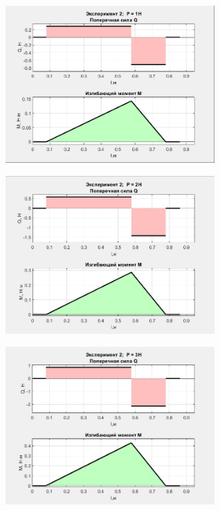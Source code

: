 \documentclass[12pt, a4paper]{article}
\begin{document}
    \begin{figure}[h!]
        \centering
        \vspace{1cm}
        \hspace{-0.5cm}
        \begin{subfigure}{0.4\textwidth}
            \centering
            \includegraphics[width = 8cm]{r_2_1.jpg}
        \end{subfigure}
        \hspace{1.2cm}
        \vspace{0.5cm}
        \begin{subfigure}{0.4\textwidth}
            \centering
            \includegraphics[width = 8cm]{r_2_2.jpg}
        \end{subfigure}
        \vspace{0.5cm}
        \hspace{-0.5cm}
        \begin{subfigure}{0.4\textwidth}
            \centering
            \includegraphics[width = 8cm]{r_2_3.jpg}

\end{subfigure}
\end{figure}
\end{document}
